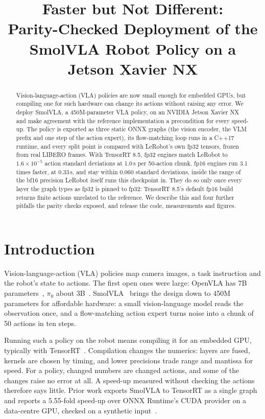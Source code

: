 \documentclass[conference]{IEEEtran}
\newcommand{\sci}[2]{\ensuremath{#1{\times}10^{#2}}}
\begin{document}
\title{Faster but Not Different:\\ Parity-Checked Deployment of the SmolVLA Robot Policy on a Jetson Xavier NX}

\author{
}

\maketitle

\begin{abstract}
Vision-language-action (VLA) policies are now small enough for embedded GPUs, but compiling one for such hardware can change its actions without raising any error. We deploy SmolVLA, a 450M-parameter VLA policy, on an NVIDIA Jetson Xavier NX and make agreement with the reference implementation a precondition for every speed-up. The policy is exported as three static ONNX graphs (the vision encoder, the VLM prefix and one step of the action expert), its flow-matching loop runs in a C++17 runtime, and every split point is compared with LeRobot's own fp32 tensors, frozen from real LIBERO frames. With TensorRT 8.5, fp32 engines match LeRobot to \sci{1.6}{-5} action standard deviations at 1.0\,s per 50-action chunk. fp16 engines run 3.1 times faster, at 0.33\,s, and stay within 0.060 standard deviations, inside the range of the bf16 precision LeRobot itself runs this checkpoint in. They do so only once every layer the graph types as fp32 is pinned to fp32: TensorRT 8.5's default fp16 build returns finite actions unrelated to the reference. We describe this and four further pitfalls the parity checks exposed, and release the code, measurements and figures.
\end{abstract}

\section{Introduction}

Vision-language-action (VLA) policies map camera images, a task instruction and the robot's state to actions. The first open ones were large: OpenVLA has 7B parameters~\cite{kim2024openvla}, $\pi_0$ about 3B~\cite{black2024pi0}. SmolVLA~\cite{shukor2025smolvla} brings the design down to 450M parameters for affordable hardware: a small vision-language model reads the observation once, and a flow-matching action expert turns noise into a chunk of 50 actions in ten steps.

Running such a policy on the robot means compiling it for an embedded GPU, typically with TensorRT~\cite{nvidia_tensorrt}. Compilation changes the numerics: layers are fused, kernels are chosen by timing, and lower precisions trade range and mantissa for speed. For a policy, changed numbers are changed actions, and some of the changes raise no error at all. A speed-up measured without checking the actions therefore says little. Prior work exports SmolVLA to TensorRT as a single graph and reports a 5.55-fold speed-up over ONNX Runtime's CUDA provider on a data-centre GPU, checked on a synthetic input~\cite{fastcrest2026tether}.
\end{document}
